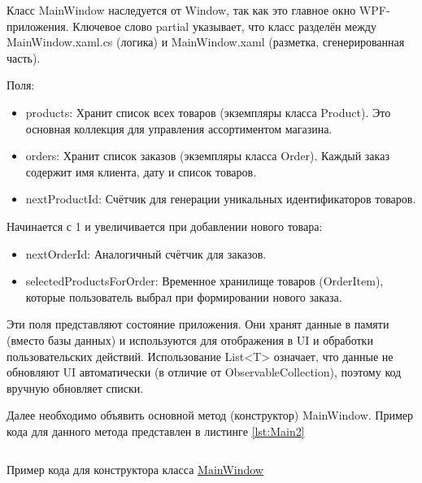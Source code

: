 \documentclass[12pt]{article}
\newcommand{\colorGIT}[1]{\textcolor{CtpLavender}{#1}}
\renewcommand{\texttt}[1]{{\small\ttfamily #1}}
\begin{document}
Класс \texttt{MainWindow} наследуется от \texttt{Window}, так как это главное окно \texttt{WPF}-приложения. Ключевое слово \texttt{partial} указывает, что класс разделён между \texttt{MainWindow.xaml.cs} (логика) и \texttt{MainWindow\-.xaml} (разметка, сгенерированная часть).

\noindent Поля:
\begin{itemize}
	\item \texttt{products}: Хранит список всех товаров (экземпляры класса \texttt{Product}). Это основная коллекция для управления ассортиментом магазина.
	\item \texttt{orders}: Хранит список заказов (экземпляры класса \texttt{Order}). Каждый заказ содержит имя клиента, дату и список товаров.
	\item \texttt{nextProductId}: Счётчик для генерации уникальных идентификаторов товаров.
\end{itemize}

\noindent Начинается с 1 и увеличивается при добавлении нового товара:
\begin{itemize}
	\item \texttt{nextOrderId}: Аналогичный счётчик для заказов.
	\item \texttt{selectedProductsForOrder}: Временное хранилище товаров (\texttt{OrderItem}), которые пользователь выбрал при формировании нового заказа.
\end{itemize}

Эти поля представляют состояние приложения. Они хранят данные в памяти (вместо базы данных) и используются для отображения в \texttt{UI} и обработки пользовательских действий. Использование \texttt{List<T>} означает, что данные не обновляют \texttt{UI} автоматически (в отличие от \texttt{Observable\-Collection}), поэтому код вручную обновляет списки.

{}
Далее необходимо объявить основной метод (конструктор) \texttt{MainWindow}.
Пример кода для данного метода представлен в листинге \ref{lst:Main2}

\begin{listing}[H]
	\inputminted[firstline=24, lastline=30]{csharp}{../../3lab/StoreManager/MainWindow.xaml.cs}
	\caption{Пример кода для конструктора класса \colorGIT{\href{https://github.com/WebMasterIT/Csharp_Labs/blob/ec375afd16c0647b337cf3d8a79c8bef904fc1be/3lab/StoreManager/MainWindow.xaml.cs\#L24-L30}{MainWindow}}}
	\label{lst:Main2}
\end{listing}
\end{document}
